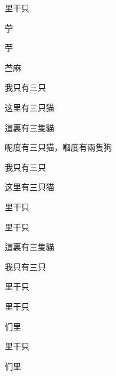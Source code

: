\documentclass{article}
\newcommand\macro{们里}
\begin{document}
\begin{jyutpingscope}[script=simplified]
里干只
\end{jyutpingscope}

\begin{jyutpingscope}[script=traditional]
苧
\end{jyutpingscope}

\begin{jyutpingscope}[script=simplified]
苧

苎麻
\end{jyutpingscope}

\begin{jyutpingscope}[script=auto]
我只有三只
\end{jyutpingscope}

\begin{jyutpingscope}[script=auto]
这里有三只猫
\end{jyutpingscope}

\begin{jyutpingscope}[script=auto]
這裏有三隻貓
\end{jyutpingscope}

\begin{jyutpingscope}[script=auto]
呢度有三只猫，嗰度有兩隻狗
\end{jyutpingscope}

\begin{jyutpingscope}
我只有三只

这里有三只猫
\end{jyutpingscope}

\begin{jyutpingscope}
里干只
\end{jyutpingscope}

\begin{jyutpingscope}
里干只

這裏有三隻貓

我只有三只
\end{jyutpingscope}

\begin{jyutpingscope}
里干只
\end{jyutpingscope}

\begin{jyutpingscope}[simplified]
里干只

\macro
\end{jyutpingscope}

\begin{jyutpingscope}[traditional]
里干只

\macro
\end{jyutpingscope}
\end{document}
